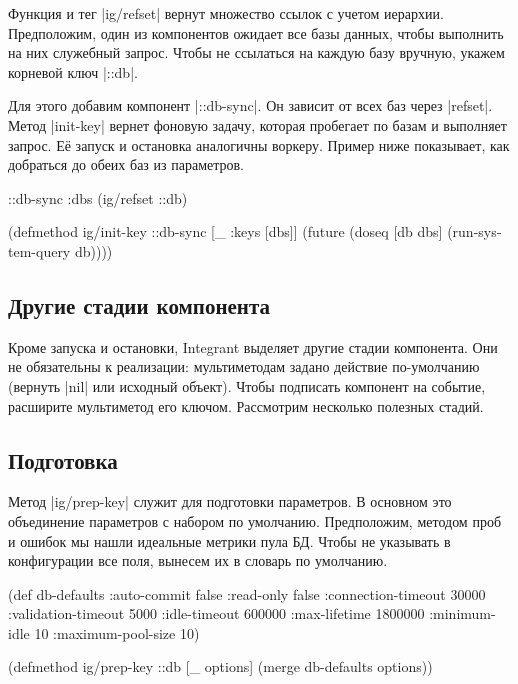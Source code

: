 Функция и тег \spverb|ig/refset| вернут множество ссылок с учетом
иерархии. Предположим, один из компонентов ожидает все базы данных, чтобы
выполнить на них служебный запрос. Чтобы не ссылаться на каждую базу вручную,
укажем корневой ключ \spverb|::db|.

Для этого добавим компонент \spverb|::db-sync|. Он зависит от всех баз через
\spverb|refset|. Метод \spverb|init-key| вернет фоновую задачу, которая
пробегает по базам и выполняет запрос. Е\"{е} запуск и остановка аналогичны
воркеру. Пример ниже показывает, как добраться до обеих баз из параметров.

\begin{english}
  \begin{clojure}
{::db-sync {:dbs (ig/refset ::db)}}

(defmethod ig/init-key ::db-sync
  [_ {:keys [dbs]}]
  (future
    (doseq [db dbs]
      (run-system-query db))))
  \end{clojure}
\end{english}

\subsection{Другие стадии компонента}

Кроме запуска и остановки, Integrant выделяет другие стадии компонента. Они не
обязательны к реализации: мультиметодам задано действие по-умолчанию (вернуть
\spverb|nil| или исходный объект). Чтобы подписать компонент на событие,
расширите мультиметод его ключом. Рассмотрим несколько полезных стадий.

\subsection{Подготовка}

Метод \spverb|ig/prep-key| служит для подготовки параметров. В основном это
объединение параметров с набором по умолчанию. Предположим, методом проб и
ошибок мы нашли идеальные метрики пула БД. Чтобы не указывать в конфигурации все
поля, вынесем их в словарь по умолчанию.

\begin{english}
  \begin{clojure}
(def db-defaults
  {:auto-commit        false
   :read-only          false
   :connection-timeout 30000
   :validation-timeout 5000
   :idle-timeout       600000
   :max-lifetime       1800000
   :minimum-idle       10
   :maximum-pool-size  10})

(defmethod ig/prep-key ::db
  [_ options]
  (merge db-defaults options))
  \end{clojure}
\end{english}

